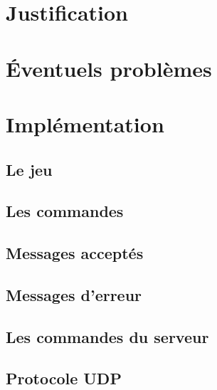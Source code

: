 \documentclass{report}
\begin{document}
	\section{Justification}
		 \label{justification}

	\section{Éventuels problèmes}
		 \label{problemes}
	
	\newpage
	\section{Implémentation}
		\subsection{Le jeu}
			 \label{jeu}
			
		\subsection{Les commandes}
			 \label{commandes}
			
		\subsection{Messages acceptés}
		\subsection{Messages d'erreur}
		\subsection{Les commandes du serveur}
		
		
		
		
		\subsection{Protocole UDP}
			 \label{udp}
							
\end{document}
